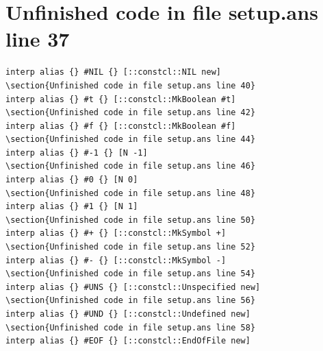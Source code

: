 \documentclass[twoside,9pt]{report}
\begin{document}
\section{Unfinished code in file setup.ans line 37}
\begin{lstlisting}
interp alias {} #NIL {} [::constcl::NIL new]
\section{Unfinished code in file setup.ans line 40}
interp alias {} #t {} [::constcl::MkBoolean #t]
\section{Unfinished code in file setup.ans line 42}
interp alias {} #f {} [::constcl::MkBoolean #f]
\section{Unfinished code in file setup.ans line 44}
interp alias {} #-1 {} [N -1]
\section{Unfinished code in file setup.ans line 46}
interp alias {} #0 {} [N 0]
\section{Unfinished code in file setup.ans line 48}
interp alias {} #1 {} [N 1]
\section{Unfinished code in file setup.ans line 50}
interp alias {} #+ {} [::constcl::MkSymbol +]
\section{Unfinished code in file setup.ans line 52}
interp alias {} #- {} [::constcl::MkSymbol -]
\section{Unfinished code in file setup.ans line 54}
interp alias {} #UNS {} [::constcl::Unspecified new]
\section{Unfinished code in file setup.ans line 56}
interp alias {} #UND {} [::constcl::Undefined new]
\section{Unfinished code in file setup.ans line 58}
interp alias {} #EOF {} [::constcl::EndOfFile new]
\end{lstlisting}
\end{document}
